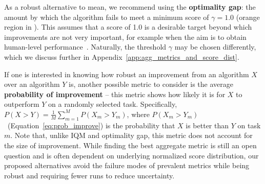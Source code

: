 As a robust alternative to mean, we recommend using the \textbf{optimality gap}:
the amount by which the algorithm fails to meet a minimum score of $\gamma = 1.0$ (orange region in ). This assumes that a score of 1.0 is a desirable target beyond which improvements are not very important, for example when the aim is to obtain human-level performance~\citep[\eg][]{dabney2018distributional, badia2020agent57}. Naturally, the threshold $\gamma$ may be chosen differently, which we discuss further in Appendix~\ref{app:agg_metrics_and_score_dist}.



If one is interested in knowing how robust an improvement from an algorithm $X$ over an algorithm $Y$ is, another possible metric to consider is the average \textbf{probability of improvement} -- this metric shows how likely it is for $X$ to outperform $Y$ on a randomly selected task. Specifically, $P(X > Y) = \tfrac{1}{M} \sum_{m=1}^{M} P(X_m > Y_m)$, where $P(X_m > Y_m)$~(Equation~\ref{eq:prob_improve}) is the probability that $X$ is better than $Y$ on task $m$. Note that, unlike IQM and optimality gap, this metric does not account for the size of improvement. While finding the best aggregate metric is still an open question and is often dependent on underlying normalized score distribution, our proposed alternatives avoid the failure modes of prevalent metrics while being robust and requiring fewer runs to reduce uncertainty.

